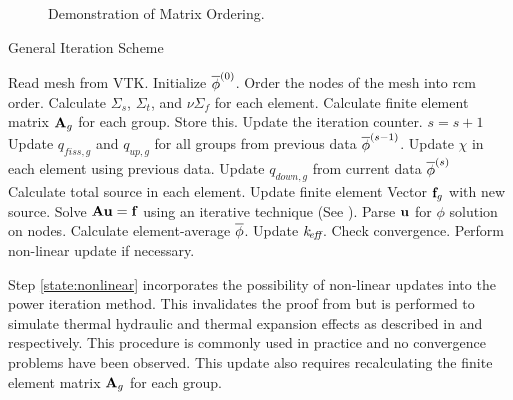     \begin{figure}
      \centering
      \hspace{0.1in}
      \caption{Demonstration of  Matrix Ordering.}
      \label{fig:sparsity_pattern}
    \end{figure}
    
    \begin{algorithm}
      \caption{General Iteration Scheme}
      \label{algorithm:general}
      \begin{algorithmic}[1]
      \State Read mesh from VTK.
      \State Initialize $\overline{\phi}^{(0)}$.
      \State Order the nodes of the mesh into \gls{rcm} order.
        \label{state:rcm}
      \State Calculate $\Sigma_s$, $\Sigma_t$, and $\nu \Sigma_f$ for each 
        element.
      \State Calculate finite element matrix $\mathbf{A}_g$ for each group. Store this. 
        \label{state:fem_matrix}
        \State Update the iteration counter. $s=s+1$
        \State Update $q_{fiss,g}$ and $q_{up,g}$ for all groups from previous 
          data $\overline{\phi}^{(s-1)}$.
        \State Update $\chi$ in each element using previous data.
          \label{state:chi_collapse}
          \State Update $q_{down,g}$ from current data $\overline{\phi}^{(s)}$
          \State Calculate total source in each element.
          \State Update finite element Vector $\mathbf{f}_g$ with new source.
            \label{state:fem_vector}
          \State Solve $\mathbf{A} \mathbf{u} = \mathbf{f}$ using an iterative technique (See
            ).
          \State Parse $\mathbf{u}$ for $\phi$ solution on nodes.
          \State Calculate element-average $\overline{\phi}$.
        \EndFor
        \State Update $k_{\!\mbox{\scriptsize \em eff}}$.
        \State Check convergence.
        \State Perform non-linear update if necessary. \label{state:nonlinear}
      \EndWhile
      \end{algorithmic}
    \end{algorithm}

    Step \ref{state:nonlinear} incorporates the possibility of non-linear
    updates into the power iteration method. This invalidates the proof from
     but is performed to simulate thermal hydraulic
    and thermal expansion effects as described in 
    and  respectively. This procedure is commonly
    used in practice and no convergence problems have been observed. This update
    also requires recalculating the finite element matrix $\mathbf{A}_g$ for each 
    group.
    

